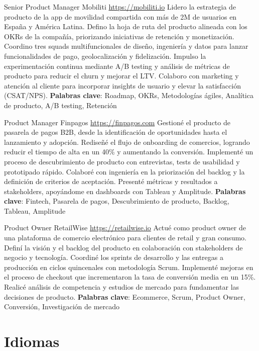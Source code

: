 \documentclass[a4paper, serif, 10pt]{moderncv}
\begin{document}
        {Senior Product Manager}
        {Mobiliti}
        {\url{https://mobiliti.io}}
        {}
        {Lidero la estrategia de producto de la app de movilidad compartida con más de 2M de usuarios en España y América Latina.
Defino la hoja de ruta del producto alineada con los OKRs de la compañía, priorizando iniciativas de retención y monetización.
Coordino tres squads multifuncionales de diseño, ingeniería y datos para lanzar funcionalidades de pago, geolocalización y fidelización.
Impulso la experimentación continua mediante A/B testing y análisis de métricas de producto para reducir el churn y mejorar el LTV.
Colaboro con marketing y atención al cliente para incorporar insights de usuario y elevar la satisfacción (CSAT/NPS).
\textbf{Palabras clave}: Roadmap, OKRs, Metodologías ágiles, Analítica de producto, A/B testing, Retención}

        {Product Manager}
        {Finpagos}
        {\url{https://finpagos.com}}
        {}
        {Gestioné el producto de pasarela de pagos B2B, desde la identificación de oportunidades hasta el lanzamiento y adopción.
Rediseñé el flujo de onboarding de comercios, logrando reducir el tiempo de alta en un 40\% y aumentando la conversión.
Implementé un proceso de descubrimiento de producto con entrevistas, tests de usabilidad y prototipado rápido.
Colaboré con ingeniería en la priorización del backlog y la definición de criterios de aceptación.
Presenté métricas y resultados a stakeholders, apoyándome en dashboards con Tableau y Amplitude.
\textbf{Palabras clave}: Fintech, Pasarela de pagos, Descubrimiento de producto, Backlog, Tableau, Amplitude}

        {Product Owner}
        {RetailWise}
        {\url{https://retailwise.io}}
        {}
        {Actué como product owner de una plataforma de comercio electrónico para clientes de retail y gran consumo.
Definí la visión y el backlog del producto en colaboración con stakeholders de negocio y tecnología.
Coordiné los sprints de desarrollo y las entregas a producción en ciclos quincenales con metodología Scrum.
Implementé mejoras en el proceso de checkout que incrementaron la tasa de conversión media en un 15\%.
Realicé análisis de competencia y estudios de mercado para fundamentar las decisiones de producto.
\textbf{Palabras clave}: Ecommerce, Scrum, Product Owner, Conversión, Investigación de mercado}
\section{Idiomas}
\end{document}
